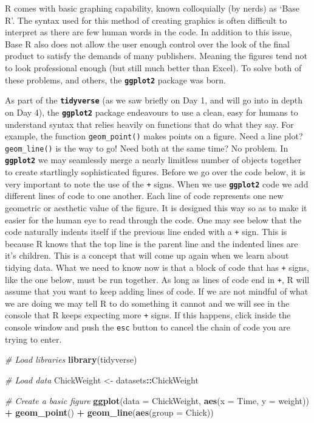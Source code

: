 \documentclass[]{book}
\newenvironment{Shaded}{\begin{snugshade}}{\end{snugshade}}
\newcommand{\KeywordTok}[1]{\textcolor[rgb]{0.13,0.29,0.53}{\textbf{#1}}}
\newcommand{\DataTypeTok}[1]{\textcolor[rgb]{0.13,0.29,0.53}{#1}}
\newcommand{\StringTok}[1]{\textcolor[rgb]{0.31,0.60,0.02}{#1}}
\newcommand{\CommentTok}[1]{\textcolor[rgb]{0.56,0.35,0.01}{\textit{#1}}}
\newcommand{\OperatorTok}[1]{\textcolor[rgb]{0.81,0.36,0.00}{\textbf{#1}}}
\newcommand{\NormalTok}[1]{#1}
\theoremstyle{definition}
\theoremstyle{definition}
\theoremstyle{definition}
\theoremstyle{remark}
\begin{document}
R comes with basic graphing capability, known colloquially (by nerds) as
`Base R'. The syntax used for this method of creating graphics is often
difficult to interpret as there are few human words in the code. In
addition to this issue, Base R also does not allow the user enough
control over the look of the final product to satisfy the demands of
many publishers. Meaning the figures tend not to look professional
enough (but still much better than Excel). To solve both of these
problems, and others, the \textbf{\texttt{ggplot2}} package was born.

As part of the \textbf{\texttt{tidyverse}} (as we saw briefly on Day 1,
and will go into in depth on Day 4), the \textbf{\texttt{ggplot2}}
package endeavours to use a clean, easy for humans to understand syntax
that relies heavily on functions that do what they say. For example, the
function \texttt{geom\_point()} makes points on a figure. Need a line
plot? \texttt{geom\_line()} is the way to go! Need both at the same
time? No problem. In \textbf{\texttt{ggplot2}} we may seamlessly merge a
nearly limitless number of objects together to create startlingly
sophisticated figures. Before we go over the code below, it is very
important to note the use of the \texttt{+} signs. When we use
\textbf{\texttt{ggplot2}} code we add different lines of code to one
another. Each line of code represents one new geometric or aesthetic
value of the figure. It is designed this way so as to make it easier for
the human eye to read through the code. One may see below that the code
naturally indents itself if the previous line ended with a \texttt{+}
sign. This is because R knows that the top line is the parent line and
the indented lines are it's children. This is a concept that will come
up again when we learn about tidying data. What we need to know now is
that a block of code that has \texttt{+} signs, like the one below, must
be run together. As long as lines of code end in \texttt{+}, R will
assume that you want to keep adding lines of code. If we are not mindful
of what we are doing we may tell R to do something it cannot and we will
see in the console that R keeps expecting more \texttt{+} signs. If this
happens, click inside the console window and push the \texttt{esc}
button to cancel the chain of code you are trying to enter.

\begin{Shaded}
\begin{Highlighting}[]
\CommentTok{# Load libraries}
\KeywordTok{library}\NormalTok{(tidyverse)}

\CommentTok{# Load data}
\NormalTok{ChickWeight <-}\StringTok{ }\NormalTok{datasets}\OperatorTok{::}\NormalTok{ChickWeight}

\CommentTok{# Create a basic figure}
\KeywordTok{ggplot}\NormalTok{(}\DataTypeTok{data =}\NormalTok{ ChickWeight, }\KeywordTok{aes}\NormalTok{(}\DataTypeTok{x =}\NormalTok{ Time, }\DataTypeTok{y =}\NormalTok{ weight)) }\OperatorTok{+}
\StringTok{  }\KeywordTok{geom_point}\NormalTok{() }\OperatorTok{+}
\StringTok{  }\KeywordTok{geom_line}\NormalTok{(}\KeywordTok{aes}\NormalTok{(}\DataTypeTok{group =}\NormalTok{ Chick))}
\end{Highlighting}
\end{Shaded}
\end{document}
